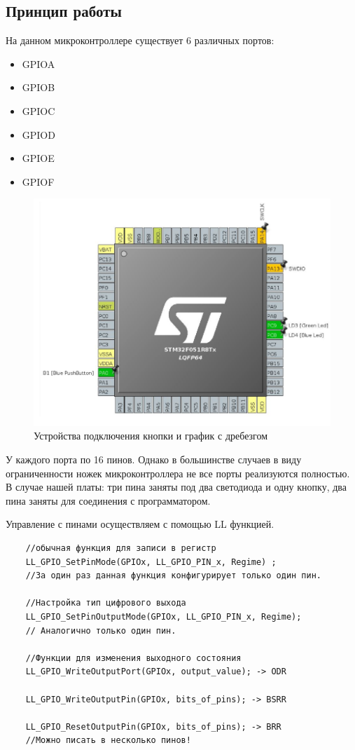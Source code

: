 \subsection{Принцип работы}

На данном микроконтроллере существует 6 различных портов:
\begin{itemize}
    \item GPIOA
    \item GPIOB
    \item GPIOC
    \item GPIOD
    \item GPIOE
    \item GPIOF
\end{itemize}   


\begin{figure}[h!]
		\centering
		\includegraphics[width=1\linewidth]{pics/scheme.png}
		\caption{Устройства подключения кнопки и график с дребезгом}
		\label{drebezg}
\end{figure}

У каждого порта по 16 пинов. Однако в большинстве случаев в виду ограниченности ножек микроконтроллера не все порты реализуются полностью. В случае нашей платы: три пина заняты под два светодиода и одну кнопку, два пина заняты для соединения с программатором. 


Управление с пинами осуществляем с помощью LL функцией.

\begin{verbatim}
    //обычная функция для записи в регистр
    LL_GPIO_SetPinMode(GPIOx, LL_GPIO_PIN_x, Regime) ;
    //За один раз данная функция конфигурирует только один пин.

    //Настройка тип цифрового выхода
    LL_GPIO_SetPinOutputMode(GPIOx, LL_GPIO_PIN_x, Regime);
    // Аналогично только один пин.
    
    //Функции для изменения выходного состояния
    LL_GPIO_WriteOutputPort(GPIOx, output_value); -> ODR
    
    LL_GPIO_WriteOutputPin(GPIOx, bits_of_pins); -> BSRR
    
    LL_GPIO_ResetOutputPin(GPIOx, bits_of_pins); -> BRR
    //Можно писать в несколько пинов!

\end{verbatim}


